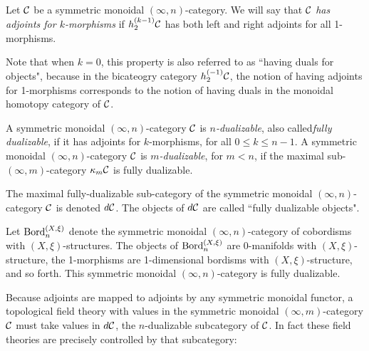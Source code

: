 \documentclass{amsart}
\begin{document}
\begin{definition}
	Let $\mathcal C$ be a symmetric monoidal $(\infty,n)$-category. We will say that $\mathcal C$ {\em has adjoints for $k$-morphisms} if $h^{(k-1)}_2 \mathcal C$ has both left and right adjoints for all 1-morphisms. 
\end{definition}

\noindent Note that when $k=0$, this property is also referred to as ``having duals for objects", because in the bicateogry category $h^{(-1)}_2 \mathcal C$, the notion of having adjoints for 1-morphisms corresponds to the notion of having duals in the monoidal homotopy category of $\mathcal C$.

\begin{definition}
A symmetric monoidal $(\infty,n)$-category $\mathcal C$ is \emph{$n$-dualizable}, also called\emph{fully dualizable}, if it has adjoints for $k$-morphisms, for all $0 \leq k \leq n-1$.
A symmetric monoidal $(\infty,n)$-category $\mathcal C$ is \emph{$m$-dualizable}, for $m<n$, if the maximal sub-$(\infty,m)$-category $\kappa_m \mathcal C$ is fully dualizable.
\end{definition} 



\noindent The maximal fully-dualizable sub-category of the symmetric monoidal $(\infty,n)$-category $\mathcal C$ is denoted $d\mathcal C$. The objects of $d\mathcal C$ are called ``fully dualizable objects". 

\begin{example}
	Let $\mathrm{Bord}^{(X,\xi)}_n$ denote the symmetric monoidal $(\infty,n)$-category of cobordisms with $(X,\xi)$-structures. The objects of $\mathrm{Bord}^{(X,\xi)}_n$ are 0-manifolds with $(X, \xi)$-structure, the 1-morphisms are 1-dimensional bordisms with $(X,\xi)$-structure, and so forth. This symmetric monoidal $(\infty,n)$-category is fully dualizable. 
\end{example}

Because adjoints are mapped to adjoints by any symmetric monoidal functor, a topological field theory with values in the symmetric monoidal $(\infty,m)$-category $\mathcal C$ must take values in $d\mathcal C$, the $n$-dualizable subcategory of $\mathcal C$. In fact these field theories are precisely controlled by that subcategory:
\end{document}
